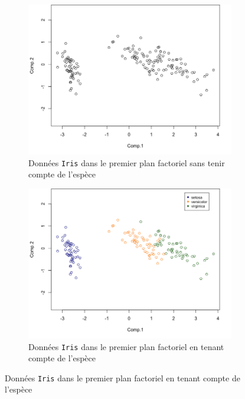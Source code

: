 \documentclass[a4paper,10pt]{report}
\begin{document}
\begin{figure}[H]
	\centering
	\captionsetup{justification=centering, margin=2cm}
	\caption{\small Représentation des données \texttt{Iris} dans le premier plan factoriel après ACP}
	\begin{subfigure}[b]{0.5\linewidth}
		\centering
		\captionsetup{justification=centering, margin=1cm}
		\includegraphics[width=1\linewidth]{img/1-iris-acp-premier-plan-factoriel}
		\caption{\small Données \texttt{Iris} dans le premier plan factoriel sans tenir compte de l'espèce}
		\label{fig:1-iris-acp-premier-plan-factoriel}
	\end{subfigure}%
	\begin{subfigure}[b]{0.5\linewidth}
		\centering
		\captionsetup{justification=centering, margin=1cm}
		\includegraphics[width=1\linewidth]{img/1-iris-acp-premier-plan-factoriel-discr-species}
		\caption{\small Données \texttt{Iris} dans le premier plan factoriel en tenant compte de l'espèce}
		\label{fig:1-iris-acp-premier-plan-factoriel-discr-species}
	\end{subfigure}%
	
	\label{fig:1-iris-acp-representation-graphique}%
\end{figure}
\end{document}
